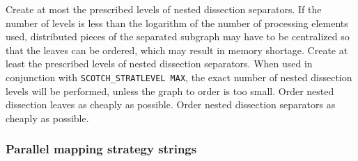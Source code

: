 \begin{itemize}
Create at most the prescribed levels of nested dissection
separators. If the number of levels is less than the logarithm of the
number of processing elements used, distributed pieces of the
separated subgraph may have to be centralized so that the leaves can
be ordered, which may result in memory shortage.
Create at least the prescribed levels of nested dissection separators.
When used in conjunction with {\tt SCOTCH\_\lbt STRAT\lbt LEVEL\lbt
MAX}, the exact number of nested dissection levels will be performed,
unless the graph to order is too small.
Order nested dissection leaves as cheaply as possible.
Order nested dissection separators as cheaply as possible.
\end{itemize}

\subsubsection{Parallel mapping strategy strings}
\label{sec-lib-format-pmap}

